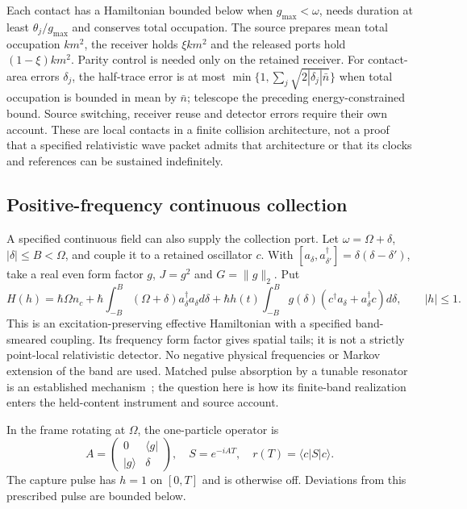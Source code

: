 \documentclass[aps,pre,onecolumn,superscriptaddress,floatfix,longbibliography]{revtex4-2}
\begin{document}
Each contact has a Hamiltonian bounded below when $g_{\max}<\omega$,
needs duration at least $\theta_j/g_{\max}$ and conserves total occupation.
The source prepares mean total occupation $km^2$, the receiver holds
$\xi km^2$ and the released ports hold $(1-\xi)km^2$. Parity control is
needed only on the retained receiver. For contact-area errors $\delta_j$,
the half-trace error is at most
$\min\{1,\sum_j\sqrt{2|\delta_j|\bar n}\}$ when total occupation is
bounded in mean by $\bar n$; telescope the preceding energy-constrained
bound. Source switching, receiver reuse and detector errors require their
own account. These are local contacts in a finite collision architecture,
not a proof that a specified relativistic wave packet admits that architecture
or that its clocks and references can be sustained indefinitely.

\subsection{Positive-frequency continuous collection}
\label{sec:band-collector}

A specified continuous field can also supply the collection port. Let
$\omega=\Omega+\delta$, $|\delta|\le B<\Omega$, and couple it to a retained
oscillator $c$. With $[a_\delta,a^\dagger_{\delta'}]=\delta(\delta-\delta')$,
take a real even form factor $g$, $J=g^2$ and $G=\|g\|_2$. Put
\begin{equation}
 H(h)=\hbar\Omega n_c+\hbar\!\int_{-B}^{B}(\Omega+\delta)
 a^\dagger_\delta a_\delta d\delta
 +\hbar h(t)\!\int_{-B}^{B}g(\delta)
 (c^\dagger a_\delta+a^\dagger_\delta c)d\delta,\qquad |h|\le1.
 \label{eq:band-H}
\end{equation}
This is an excitation-preserving effective Hamiltonian with a specified
band-smeared coupling. Its frequency form factor gives spatial tails; it is
not a strictly point-local relativistic detector. No negative physical
frequencies or Markov extension of the band are used. Matched pulse absorption
by a tunable resonator is an established mechanism~\cite{Wenner2014}; the
question here is how its finite-band realization enters the held-content
instrument and source account.

In the frame rotating at $\Omega$, the one-particle operator is
\[
 A=\begin{pmatrix}0&\langle g|\\|g\rangle&\delta\end{pmatrix},
 \quad S=e^{-iAT},\quad r(T)=\langle c|S|c\rangle.
\]
The capture pulse has $h=1$ on $[0,T]$ and is otherwise off. Deviations from
this prescribed pulse are bounded below.
\end{document}
